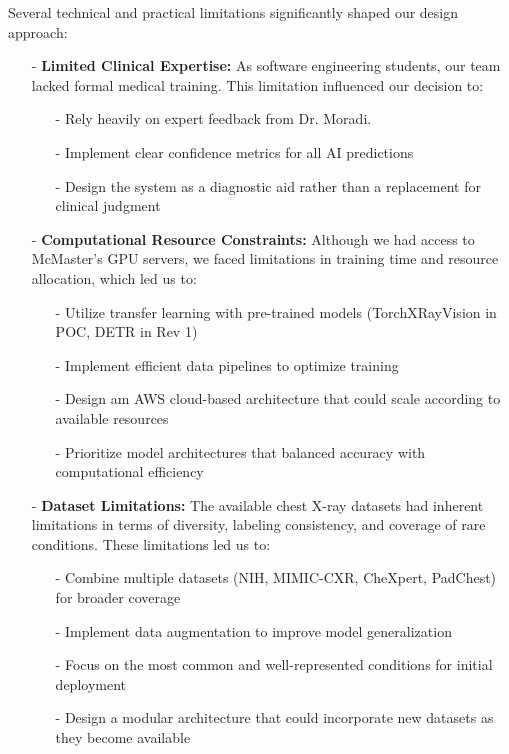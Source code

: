 \documentclass{article}
\begin{document}
Several technical and practical limitations significantly shaped our design approach:

\begin{itemize}
    \item[-] \textbf{Limited Clinical Expertise:} As software engineering students, our team lacked formal medical training. This limitation influenced our decision to:
    \begin{itemize}
        \item[-] Rely heavily on expert feedback from Dr. Moradi.
        \item[-] Implement clear confidence metrics for all AI predictions
        \item[-] Design the system as a diagnostic aid rather than a replacement for clinical judgment
    \end{itemize}
    
    \item[-] \textbf{Computational Resource Constraints:} Although we had access to McMaster's GPU servers, we faced limitations in training time and resource allocation, which led us to:
    \begin{itemize}
        \item[-] Utilize transfer learning with pre-trained models (TorchXRayVision in POC, DETR in Rev 1)
        \item[-] Implement efficient data pipelines to optimize training
        \item[-] Design am AWS cloud-based architecture that could scale according to available resources
        \item[-] Prioritize model architectures that balanced accuracy with computational efficiency
    \end{itemize}
    
    \item[-] \textbf{Dataset Limitations:} The available chest X-ray datasets had inherent limitations in terms of diversity, labeling consistency, and coverage of rare conditions. These limitations led us to:
    \begin{itemize}
        \item[-] Combine multiple datasets (NIH, MIMIC-CXR, CheXpert, PadChest) for broader coverage
        \item[-] Implement data augmentation to improve model generalization
        \item[-] Focus on the most common and well-represented conditions for initial deployment
        \item[-] Design a modular architecture that could incorporate new datasets as they become available
    \end{itemize}
\end{itemize}
\end{document}
